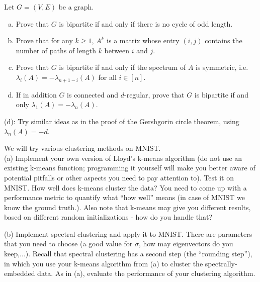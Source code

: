 \begin{myexercise}\label{prob:bipartite_graphs}
    Let $G = (V,E)$ be a graph.
    \begin{enumerate}[(a)]
        \item Prove that $G$ is bipartite if and only if there is no cycle of odd length.
        \item Prove that for any $k \geq 1$, $A^k$ is a matrix whose entry $(i, j)$ contains the number of paths of length $k$ between $i$ and $j$.
        \item Prove that $G$ is bipartite if and only if the spectrum of $A$ is symmetric, i.e. $\lambda_i(A) = - \lambda_{n+1-i}(A)$ for all $i \in [n]$.
        \item If in addition $G$ is connected and $d$-regular, prove that $G$ is bipartite if and only $\lambda_1(A) = - \lambda_n(A)$.
    \end{enumerate} 
\end{myexercise}
\begin{hint}
    (d): Try similar ideas as in the proof of the Gershgorin circle theorem, using $\lambda_n(A) = -d$.
\end{hint}




   





\begin{myexercise}
We will try various clustering methods on MNIST.  \\
(a) Implement your own version of Lloyd's k-means algorithm (do not use an existing k-means function; programming  it yourself will make you better aware of potential pitfalls or other aspects you need to pay attention to). Test it on MNIST. How well does k-means cluster the data? You need to come up with a performance metric to quantify what ``how well'' means (in case of MNIST we know the ground truth.). Also note that k-means may give you different results, based on different random initializations - how do you handle that?


\noindent
(b) Implement  spectral clustering and apply it to MNIST. There are parameters that you need to choose (a good value for $\sigma$, how may eigenvectors do you keep,...).
Recall that spectral clustering has a second step (the ``rounding step''), in which you use your k-means algorithm from (a) to cluster the spectrally-embedded data. As in (a), evaluate the performance of your clustering algorithm.
\end{myexercise}
